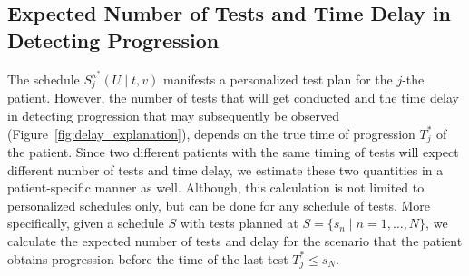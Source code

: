 \subsection{Expected Number of Tests and Time Delay in Detecting Progression}
\label{subsec:exp_delay_estimation}
The schedule $S_j^{\kappa^*}(U \mid t, v)$ manifests a personalized test plan for the $j$-the patient. However, the number of tests that will get conducted and the time delay in detecting progression that may subsequently be observed (Figure~\ref{fig:delay_explanation}), depends on the true time of progression $T^*_j$ of the patient. Since two different patients with the same timing of tests will expect different number of tests and time delay, we estimate these two quantities in a patient-specific manner as well. Although, this calculation is not limited to personalized schedules only, but can be done for any schedule of tests. More specifically, given a schedule $S$ with tests planned at $S=\{s_n \mid n=1,\ldots, N\}$, we calculate the expected number of tests and delay for the scenario that the patient obtains progression before the time of the last test $T^*_j \leq s_N$.

